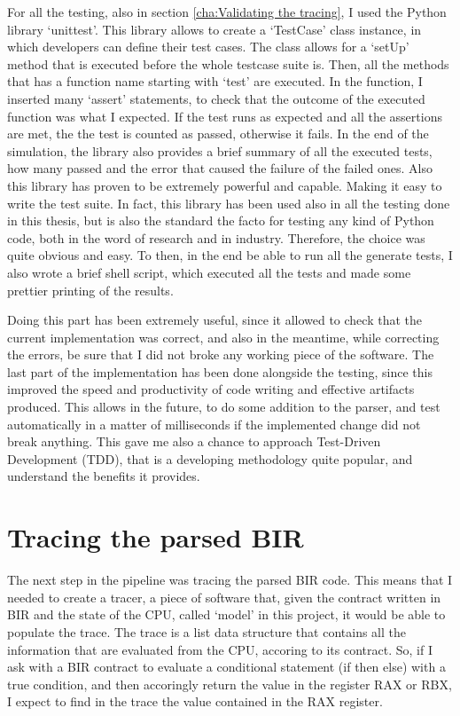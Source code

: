 For all the testing, also in section \ref{cha:Validating the tracing}, I used the
Python library `unittest'. This library allows to create a `TestCase' class
instance, in which developers can define their test cases. The class allows for
a `setUp' method that is executed before the whole testcase suite is. Then, all
the methods that has a function name starting with `test' are executed. In the function,
I inserted many `assert' statements, to check that the outcome of the executed function
was what I expected. If the test runs as expected and all the assertions are met,
the the test is counted as passed, otherwise it fails. In the end of the simulation,
the library also provides a brief summary of all the executed tests, how many passed
and the error that caused the failure of the failed ones. Also this library has
proven to be extremely powerful and capable. Making it easy to write the test suite.
In fact, this library has been used also in all the testing done in this thesis,
but is also the standard the facto for testing any kind of Python code, both in the
word of research and in industry. Therefore, the choice was quite obvious and easy.
To then, in the end be able to run all the generate tests, I also wrote a brief
shell script, which executed all the tests and made some prettier printing of the
results.

Doing this part has been extremely useful, since it allowed to check that the
current implementation was correct, and also in the meantime, while correcting
the errors, be sure that I did not broke any working piece of the software. The
last part of the implementation has been done alongside the testing, since this improved
the speed and productivity of code writing and effective artifacts produced.
This allows in the future, to do some addition to the parser, and test
automatically in a matter of milliseconds if the implemented change did not
break anything. This gave me also a chance to approach Test-Driven Development (TDD),
that is a developing methodology quite popular, and understand the benefits it provides.

\section{Tracing the parsed BIR}
\label{cha:Tracing the parsed BIR} The next step in the pipeline was tracing the
parsed BIR code. This means that I needed to create a tracer, a piece of software
that, given the contract written in BIR and the state of the CPU, called `model'
in this project, it would be able to populate the trace. The trace is a list data
structure that contains all the information that are evaluated from the CPU,
accoring to its contract. So, if I ask with a BIR contract to evaluate a
conditional statement (if then else) with a true condition, and then accoringly return
the value in the register RAX or RBX, I expect to find in the trace the value
contained in the RAX register.

